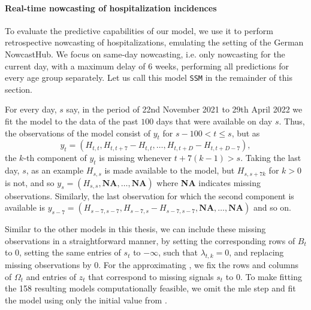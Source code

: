 \paragraph{Real-time nowcasting of hospitalization incidences}
\newcommand*{\ssm}{\texttt{SSM}\xspace}
\newcommand*{\ilmprop}{\texttt{ILM-prop42}\xspace}
\newcommand*{\ensemble}{\texttt{MeanEnsemble}\xspace}
To evaluate the predictive capabilities of our model, we use it to perform retrospective nowcasting of hospitalizations, emulating the setting of the German NowcastHub. 
We focus on same-day nowcasting, i.e. only nowcasting for the current day, with a maximum delay of $6$ weeks, performing all predictions for every age group separately. Let us call this model \ssm in the remainder of this section.

For every day, $s$ say, in the period of 22nd November 2021 to 29th April 2022 we fit the model to the data of the past $100$ days that were available on day $s$. 
Thus, the observations of the model consist of $y_{t}$ for $s - 100 < t \leq s$, but as 
$$
    y_{t} = \left( H_{t,t}, H_{t, t + 7} - H_{t,t}, \dots, H_{t, t + D}  - H_{t,t + D - 7}\right),
$$
the $k$-th component of $y_{t}$ is missing whenever $t + 7(k - 1) > s$. 
Taking the last day, $s$, as an example $H_{s,s}$ is made available to the model, but $H_{s, s+7k}$ for $k > 0$ is not, and so $y_{s} = \left( H_{s,s}, \textbf{NA}, \dots, \textbf{NA} \right)$ where \textbf{NA} indicates missing observations. Similarly, the last observation for which the second component is available is $y_{s - 7} = \left( H_{s-7, s-7}, H_{s-7, s} - H_{s - 7, s - 7}, \textbf{NA}, \dots, \textbf{NA} \right)$ and so on. 

Similar to the other models in this thesis, we can include these missing observations in a straightforward manner, by setting the corresponding rows of $B_{t}$ to $0$, setting the same entries of $s_{t}$ to $-\infty$, such that $\lambda_{t,k} = 0$, and replacing missing observations by $0$. For the approximating , we fix the rows and columns of $\Omega_{t}$ and entries of $z_{t}$ that correspond to missing signals $s_{t}$ to $0$. 
To make fitting the 158 resulting models computationally feasible, we omit the \acrshort{mle} step and fit the model using only the initial value from . 


